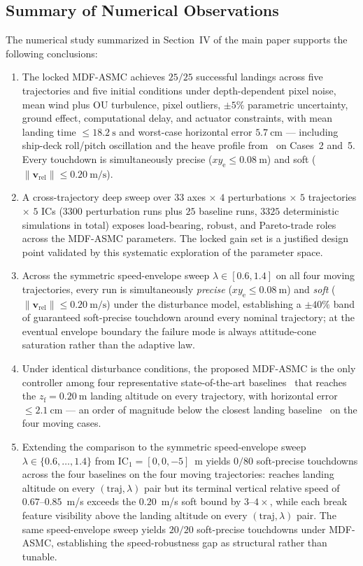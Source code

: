 \documentclass[10pt,journal]{IEEEtran}
\begin{document}
\subsection{Summary of Numerical Observations}
\label{sec:sup-summary}
The numerical study summarized in Section~IV of the main paper supports the following conclusions:
\begin{enumerate}
    \item The locked MDF-ASMC achieves $25/25$ successful landings across five trajectories and five initial conditions under depth-dependent pixel noise, mean wind plus OU turbulence, pixel outliers, $\pm5\%$ parametric uncertainty, ground effect, computational delay, and actuator constraints, with mean landing time $\le 18.2~\text{s}$ and worst-case horizontal error $5.7~\text{cm}$ --- including ship-deck roll/pitch oscillation and the heave profile from~\cite{lin2022} on Cases~2 and~5. Every touchdown is simultaneously precise ($xy_\text{e}\le 0.08~\text{m}$) and soft ($\|\boldsymbol{v}_\text{rel}\|\le 0.20~\text{m/s}$).
    \item A cross-trajectory deep sweep over $33$ axes $\times$ $4$ perturbations $\times$ $5$ trajectories $\times$ $5$ ICs ($3300$ perturbation runs plus $25$ baseline runs, $3325$ deterministic simulations in total) exposes load-bearing, robust, and Pareto-trade roles across the MDF-ASMC parameters. The locked gain set is a justified design point validated by this systematic exploration of the parameter space.
    \item Across the symmetric speed-envelope sweep $\lambda\in[0.6,1.4]$ on all four moving trajectories, every run is simultaneously \emph{precise} ($xy_\text{e}\le 0.08~\text{m}$) and \emph{soft} ($\|\boldsymbol{v}_\text{rel}\|\le 0.20~\text{m/s}$) under the disturbance model, establishing a $\pm 40\%$ band of guaranteed soft-precise touchdown around every nominal trajectory; at the eventual envelope boundary the failure mode is always attitude-cone saturation rather than the adaptive law.
    \item Under identical disturbance conditions, the proposed MDF-ASMC is the only controller among four representative state-of-the-art baselines~\cite{lin2022,zhang2026,chen2025,cho2022} that reaches the $z_\text{f}=0.20~\text{m}$ landing altitude on every trajectory, with horizontal error $\le 2.1~\text{cm}$ --- an order of magnitude below the closest landing baseline~\cite{zhang2026} on the four moving cases.
    \item Extending the comparison to the symmetric speed-envelope sweep $\lambda\in\{0.6,\ldots,1.4\}$ from IC$_1=[0,0,-5]$~m yields $0/80$ soft-precise touchdowns across the four baselines on the four moving trajectories: \cite{zhang2026} reaches landing altitude on every $(\text{traj},\lambda)$ pair but its terminal vertical relative speed of $0.67$--$0.85$~m/s exceeds the $0.20$~m/s soft bound by $3$--$4\times$, while \cite{lin2022,chen2025,cho2022} each break feature visibility above the landing altitude on every $(\text{traj},\lambda)$ pair. The same speed-envelope sweep yields $20/20$ soft-precise touchdowns under MDF-ASMC, establishing the speed-robustness gap as structural rather than tunable.
\end{enumerate}


\end{document}
